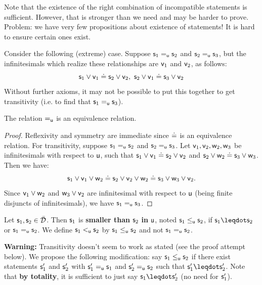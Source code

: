 \documentclass[11pt]{article}
\begin{document}
Note that the existence of the right combination of incompatible statements is sufficient. However, that is stronger than we need and may be harder to prove. Problem: we have very few propositions about existence of statements! It is hard to ensure certain ones exist. 

Consider the following (extreme) case. Suppose $\stmt_1\equ\stmt_2$ and $\stmt_2\equ\stmt_3$, but the infinitesimals which realize these relationships are $\stmt[v]_1$ and $\stmt[v]_2$, as follows:
$$
\stmt_1\OR\stmt[v]_1 \eqgran \stmt_2\OR\stmt[v]_2,\ \stmt_2\OR\stmt[v]_1\eqgran\stmt_3\OR\stmt[v]_2
$$
Without further axioms, it may not be possible to put this together to get transitivity (i.e. to find that $\stmt_1\equ\stmt_3$). 


\begin{prop}
The relation $\equ$ is an equivalence relation.
\end{prop}
\begin{proof}
Reflexivity and symmetry are immediate since $\eqgran$ is an equivalence relation. For transitivity, suppose $\stmt_1\equ\stmt_2$ and $\stmt_2\equ\stmt_3$. Let $\stmt[v]_1,\stmt[v]_2,\stmt[w]_2,\stmt[w]_3$ be infinitesimals with respect to $\stmt[u]$, such that $\stmt_1\OR\stmt[v]_1\eqgran\stmt_2\OR\stmt[v]_2$ and $\stmt_2\OR\stmt[w]_2\eqgran\stmt_3\OR\stmt[w]_3$. Then we have:
$$
\stmt_1\OR\stmt[v]_1\OR\stmt[w]_2 \eqgran \stmt_2\OR\stmt[v]_2\OR\stmt[w]_2 \eqgran \stmt_3\OR\stmt[w]_3\OR\stmt[v]_2.
$$
Since $\stmt[v]_1\OR\stmt[w]_2$ and $\stmt[w]_3\OR\stmt[v]_2$ are infinitesimal with respect to $\stmt[u]$ (being finite disjuncts of infinitesimals), we have $\stmt_1\equ\stmt_3$. 
\end{proof}

\begin{defn}\label{smalleru}
Let $\stmt_1, \stmt_2 \in \tdomain$. Then $\stmt_1$ is \textbf{smaller than} $\stmt_2$ \textbf{in} $\stmt[u]$, noted $\stmt_1 \lequ \stmt_2$, if $\stmt_1 \finer \stmt_2$ or $\stmt_1 \equ \stmt_2$. We define $\stmt_1\leu\stmt_2$ by $\stmt_1\lequ\stmt_2$ and not $\stmt_1\equ\stmt_2$. 
\end{defn}
{\bf Warning:} Transitivity doesn't seem to work as stated (see the proof attempt below). We propose the following modification: say $\stmt_1\lequ\stmt_2$ if there exist statements $\stmt_1'$ and $\stmt_2'$ with $\stmt_1'\equ\stmt_1$ and $\stmt_2'\equ\stmt_2$ such that $\stmt_1'\finer\stmt_2'$. Note that {\bf by totality}, it is sufficient to just say $\stmt_1\finer\stmt_2'$ (no need for $\stmt_1'$). 
\end{document}
